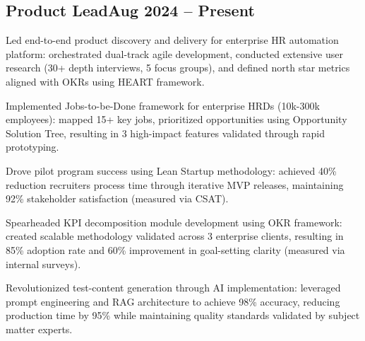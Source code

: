 \documentclass[a4paper,12pt]{article}
\begin{document}
\subsection{{Product Lead}\hfill Aug 2024 -- Present}
\begin{zitemize}
\item Led end-to-end product discovery and delivery for enterprise HR automation platform: orchestrated dual-track agile development, conducted extensive user research (30+ depth interviews, 5 focus groups), and defined north star metrics aligned with OKRs using HEART framework.
\item Implemented Jobs-to-be-Done framework for enterprise HRDs (10k-300k employees): mapped 15+ key jobs, prioritized opportunities using Opportunity Solution Tree, resulting in 3 high-impact features validated through rapid prototyping.
\item Drove pilot program success using Lean Startup methodology: achieved 40\% reduction recruiters process time through iterative MVP releases, maintaining 92\% stakeholder satisfaction (measured via CSAT).
\item Spearheaded KPI decomposition module development using OKR framework: created scalable methodology validated across 3 enterprise clients, resulting in 85\% adoption rate and 60\% improvement in goal-setting clarity (measured via internal surveys).
\item Revolutionized test-content generation through AI implementation: leveraged prompt engineering and RAG architecture to achieve 98\% accuracy, reducing production time by 95\% while maintaining quality standards validated by subject matter experts.
\end{zitemize}

\vspace*{6pt}
\end{document}
